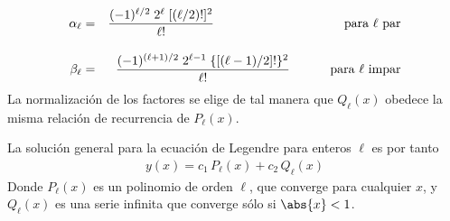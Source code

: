 \begin{align}
\alpha_{\ell} &=& \dfrac{(-1)^{\ell/2} \; 2^{\ell} \; [(\ell / 2)!]^{2}}{\ell!} \hspace{3.5cm} \text{ para $\ell$ par} \label{eq:ecuacion_18_05}\\[1em]
\beta_{\ell} &=& \dfrac{(-1)^{(\ell + 1)/2} \; 2^{\ell - 1} \; \lbrace \left[ (\ell - 1) /2 \right] ! \rbrace^{2}}{\ell!} \hspace{1cm} \text{ para $\ell$ impar} \label{eq:ecuacion_18_06}
\end{align}
La normalización de los factores se elige de tal manera que $Q_{\ell}(x)$ obedece la misma relación de recurrencia de $P_{\ell}(x)$.
\par
La solución general para la ecuación de Legendre para enteros $\ell$ es por tanto
\begin{align}
y(x) = c_{1} \, P_{\ell}(x) + c_{2} \, Q_{\ell} (x) 
\label{eq:ecuacion_18_07}
\end{align}
Donde $P_{\ell}(x)$ es un polinomio de orden $\ell$, que converge para cualquier $x$, y $Q_{\ell}(x)$ es una serie infinita que converge sólo si $\abs{x} < 1$.
